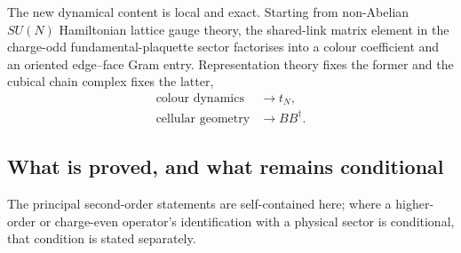 \documentclass[11pt]{article}
\theoremstyle{plain}
\theoremstyle{definition}
\theoremstyle{remark}
\newcommand{\dg}{^{\dagger}}
\begin{document}
The new dynamical content is local and exact. Starting from non-Abelian
$SU(N)$ Hamiltonian lattice gauge theory, the shared-link matrix element in the
charge-odd fundamental-plaquette sector factorises into a colour coefficient
and an oriented edge--face Gram entry. Representation theory fixes the former
and the cubical chain complex fixes the latter,
\[
  \begin{aligned}
    \text{colour dynamics}&\longrightarrow t_N,\\
    \text{cellular geometry}&\longrightarrow BB\dg .
  \end{aligned}
\]

\subsection*{What is proved, and what remains conditional}

The principal second-order statements are self-contained here; where a
higher-order or charge-even operator's identification with a physical sector
is conditional, that condition is stated separately.
\end{document}
